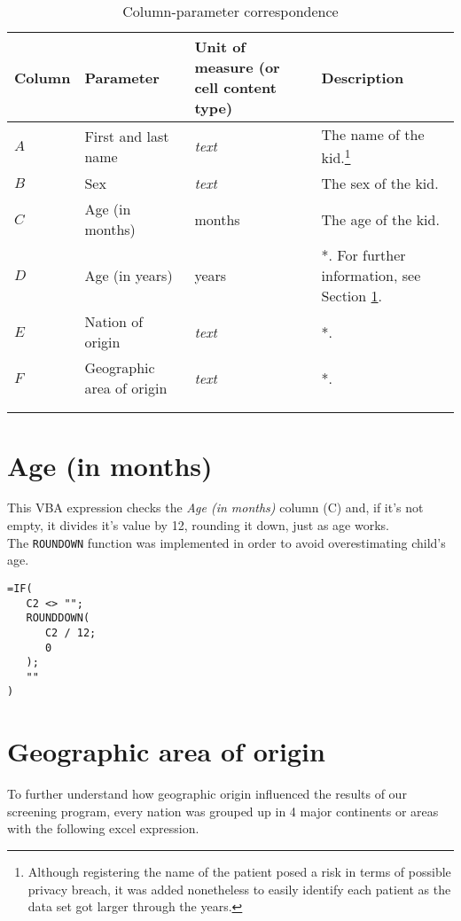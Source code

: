 \begin{longtable}{|l|l|l|l|}
	\hline
	\textbf{Column} & \textbf{Parameter} & \textbf{Unit of measure (or cell content type)} & \textbf{Description} \\[6pt]
	\hline \hline
	$A$ & First and last name & \textit{text} & The name of the kid.\footnote{Although registering the name of the patient posed a risk in terms of possible privacy breach, it was added nonetheless to easily identify each patient as the data set got larger through the years.}\\[6pt]
		\hline
		$B$ & Sex & \textit{text} & The sex of the kid.\\[6pt]
		\hline
		$C$ & Age (in months) & months & The age of the kid.  \\[6pt]
		\hline
		$D$ & Age (in years) & years & *. For further information, see Section \ref{sec:ageinmonths}. \\[6pt]
		\hline
		$E$ & Nation of origin & \textit{text} & *. \\[6pt]
		\hline
		$F$ & Geographic area of origin & \textit{text} & *. \\[6pt]
		\hline
		\caption{Column-parameter correspondence} \\
		\label{tab:columnparameter}
\end{longtable} 

\section{Age (in months)}\label{sec:ageinmonths}
This VBA expression checks the \textit{Age (in months)} column (C) and, if it's not empty, it divides it's value by 12, rounding it down, just as age works.\\
The \texttt{ROUNDOWN} function was implemented in order to avoid overestimating child's age.

\begin{minipage}{\linewidth}
\begin{lstlisting}
=IF(
   C2 <> "";
   ROUNDDOWN(
      C2 / 12;
      0
   );
   ""
)
\end{lstlisting}
\end{minipage}

\section{Geographic area of origin}\label{sec:geographicarea}
To further understand how geographic origin influenced the results of our screening program, every nation was grouped up in 4 major continents or areas with the following excel expression.

